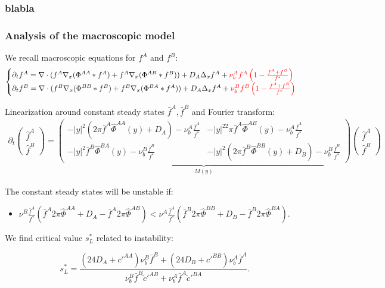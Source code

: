 \documentclass[10pt]{beamer}
\def \p {{\partial}}
\def \bfA {{\bar{f}^A}}
\def \bfB {{\bar{f}^B}}
\def \hPAA {{\hat{\Phi}^{AA}}}
\def \hPBB {{\hat{\Phi}^{BB}}}
\def \hPAB {{\hat{\Phi}^{AB}}}
\def \hPBA {{\hat{\Phi}^{BA}}}
\newcommand\Fontvi{\fontsize{8}{7.2}\selectfont}
\begin{document}
\begin{frame}
\frametitle{blabla}
\end{frame}


\begin{frame}
\frametitle{Analysis of the macroscopic model}
\Fontvi
We recall macroscopic equations for $f^{A}$ and $f^{B}$:
	\begin{equation}
\begin{cases}
\p_t f^{A}=  \nabla \cdot (f^A\nabla_x(\Phi^{AA}* f^A) + f^A \nabla_x( \Phi^{AB}*f^B)) + D_A \Delta_x f^A + \textcolor{red}{\nu_{b}^{A}f^A\left( 1-\frac{f^A+f^B}{f^{*}} \right)} \\

\p_t f^{B}=  \nabla \cdot (f^B\nabla_x(\Phi^{BB}* f^B) + f^B \nabla_x (\Phi^{BA}*f^A)) + D_A \Delta_x f^A + \textcolor{red}{\nu_{b}^{B}f^B\left( 1-\frac{f^A+f^B}{f^{*}} \right)}
\end{cases}
\end{equation}

Linearization around constant steady states $\bfA, \bfB$ and Fourier transform:
\begin{align}
\p_t \begin{pmatrix} \hat{f}^A \\ \hat{f}^B
\end{pmatrix}=
\underbrace{\begin{pmatrix} -|y|^2(2\pi\bfA\hPAA(y)+D_A)-\nu_{b}^A\frac{\bfA}{f^*} & -|y|^22\pi\bfA\hPAB(y)-\nu_{b}^A\frac{\bfA}{f^*} \\ 
-|y|^2\bfB\hPBA(y)-\nu_{b}^B\frac{\bfB}{f^*} & -|y|^2(2\pi\bfB\hPBB(y)+D_B)-\nu_{b}^B\frac{\bfB}{f^*} 
\end{pmatrix}}_{M(y)}
\begin{pmatrix} \hat{f}^A \\ \hat{f}^B
\end{pmatrix}
\end{align}

The constant steady states will be unstable if:
\begin{itemize}
	\item $ \nu^{B}\frac{\bfA}{f^{*}}( \bfA 2\pi \hPAA+D_A - \bfA 2 \pi \hPAB )<
	\nu^{A} \frac{\bfA}{f^{*}}( \bfB 2 \pi \hPBB + D_B-\bfB 2\pi \hPBA ). $	
\end{itemize}

We find critical value $s_{L}^{*}$ related to instability:

$$s_{L}^{*}=\frac{(24 D_A+c'^{AA})\nu_{b}^{B}\bar{f}^{B}+(24 D_B+c'^{BB})\nu_{b}^{A}\bar{f}^A}{\nu_{b}^{B}\bar{f}^B\tilde{c}'^{AB}+\nu_{b}^{A}\bar{f}^A\tilde{c}'^{BA}}. $$


\end{frame}
\end{document}
